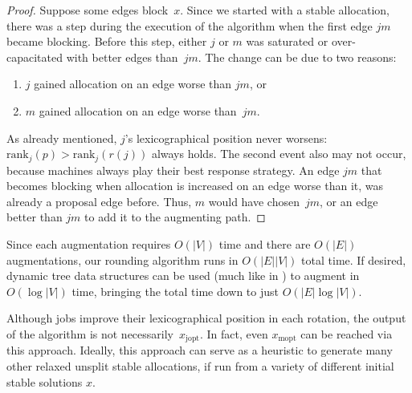 \documentclass{llncs}
\begin{document}
\begin{proof} 
Suppose some edges block~$x$. Since we started with a stable
allocation, there was a step during the execution of the algorithm
when the first edge $jm$ became blocking. Before this step, either $j$
or $m$ was saturated or over-capacitated with better edges
than~$jm$. The change can be due to two reasons:
\begin{enumerate}
	\item $j$ gained allocation on an edge worse than $jm$, or
	\item $m$ gained allocation on an edge worse than~$jm$.
\end{enumerate}
As already mentioned, $j$'s lexicographical position never worsens:
$\text{rank}_j(p) > \text{rank}_j(r(j))$ always holds. The second
event also may not occur, because machines always play their best
response strategy. An edge $jm$ that becomes blocking when allocation
is increased on an edge worse than it, was already a proposal edge
before. Thus, $m$ would have chosen~$jm$, or an edge better than $jm$
to add it to the augmenting path.
\end{proof}

Since each augmentation requires $O(|V|)$ time and there are $O(|E|)$
augmentations, our rounding algorithm runs in $O(|E||V|)$ total time.
If desired, dynamic tree data structures can be used (much like in
\cite{DBLP:journals/algorithmica/DeanM10}) to augment in $O(\log |V|)$
time, bringing the total time down to just $O(|E| \log |V|)$.  

Although jobs improve their lexicographical position in each rotation,
the output of the algorithm is not necessarily~$x_{\text{jopt}}$. In
fact, even $x_{\text{mopt}}$ can be reached via this approach.
Ideally, this approach can serve as a heuristic to generate many other
relaxed unsplit stable allocations, if run from a variety of different
initial stable solutions $x$.

\iffalse
 since
Machines always increase the allocation value on their best positive
proposal edge. Thus, if the stable fractional allocation in the input
was close to the machine-optimal stable solution, then these
fractional edges might well be amongst the worst choices of the
jobs. A stable unsplit assignment can be reached before any
augmentation would be performed along empty proposal edges.
\fi

\iffalse
\end{document}
